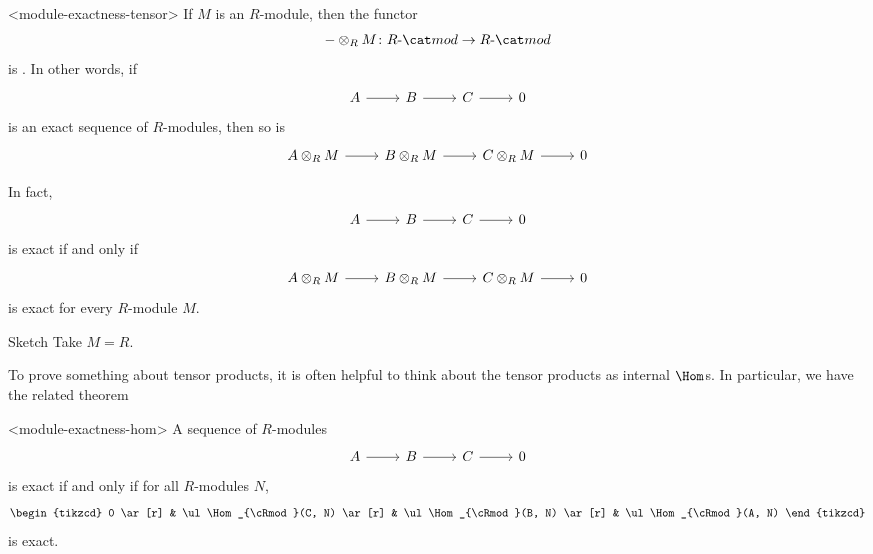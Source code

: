\documentclass{standalone}
\begin{document}
\begin{proposition}<module-exactness-tensor>
  If \(M\) is an \(R\)-module, then the functor
  \[
    {-} \otimes_R M \colon \cRmod \to \cRmod
  \]
  is .
  In other words, if
  \[
    \begin{tikzcd}
      A \ar[r] &
      B \ar[r] &
      C \ar[r] &
      0
    \end{tikzcd}
  \]
  is an exact sequence of \(R\)-modules, then so is
  \[
    \begin{tikzcd}
      A \otimes_R M \ar[r] &
      B \otimes_R M \ar[r] &
      C \otimes_R M \ar[r] &
      0
    \end{tikzcd}
  \]
\end{proposition}
\begin{corollary}
  In fact,
  \[
    \begin{tikzcd}
      A \ar[r] &
      B \ar[r] &
      C \ar[r] &
      0
    \end{tikzcd}
  \]
  is exact if and only if
  \[
    \begin{tikzcd}
      A \otimes_R M \ar[r] &
      B \otimes_R M \ar[r] &
      C \otimes_R M \ar[r] &
      0
    \end{tikzcd}
  \]
  is exact for every \(R\)-module \(M\).
\end{corollary}
\begin{proof*}{Sketch}
  Take \(M = R\).
\end{proof*}

To prove something about tensor products,
it is often helpful to think about
the tensor products as internal \(\Hom\)s.
In particular, we have the related theorem
\begin{proposition}<module-exactness-hom>
  A sequence of \(R\)-modules
  \[
    \begin{tikzcd}
      A \ar[r] &
      B \ar[r] &
      C \ar[r] &
      0
    \end{tikzcd}
  \]
  is exact if and only if for all \(R\)-modules \(N\),
  \[
    \begin{tikzcd}
      0 \ar[r] &
      \ul\Hom_{\cRmod}(C, N) \ar[r] &
      \ul\Hom_{\cRmod}(B, N) \ar[r] &
      \ul\Hom_{\cRmod}(A, N)
    \end{tikzcd}
  \]
  is exact.
\end{proposition}
\end{document}
